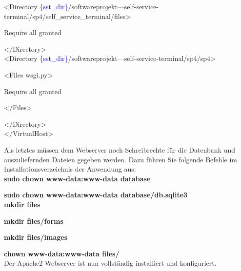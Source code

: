 	<Directory \textcolor{blue}{\{sst\_dir\}}/softwareprojekt---self-service-terminal/sp4/self\_service\_terminal/files>\par
	Require all granted\par
	</Directory>\\


	<Directory \textcolor{blue}{\{sst\_dir\}}/softwareprojekt---self-service-terminal/sp4/sp4>\par
	<Files wsgi.py>\par
	Require all granted\par
	</Files>\par
	</Directory>\\	

</VirtualHost>\\

\newpage

\noindent Als letztes müssen dem Webserver noch Schreibrechte für die Datenbank und auszuliefernden Dateien gegeben werden. Dazu führen Sie folgende Befehle im Installationsverzeichnis der Anwendung aus:\\

\textbf{sudo chown www-data:www-data database}\par
\textbf{sudo chown www-data:www-data database/db.sqlite3}\\

\textbf{mkdir files}\par
\textbf{mkdir files/forms}\par
\textbf{mkdir files/images}\par
\textbf{chown www-data:www-data files/}\\

\noindent Der Apache2 Webserver ist nun vollständig installiert und konfiguriert.